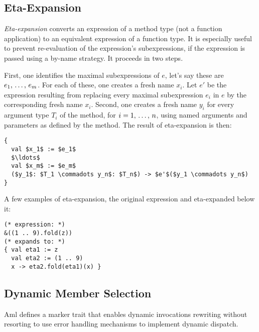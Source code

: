 



\subsection{Eta-Expansion}
\label{sec:eta-expansion}

{\em Eta-expansion} converts an expression of a method type (not a function application) to an equivalent expression of a function type. It is especially useful to prevent re-evaluation of the expression's subexpressions, if the expression is passed using a by-name strategy. It proceeds in two steps. 

First, one identifies the maximal subexpressions of $e$, let's say these are $e_1 ,\, \ldots ,\, e_m$. For each of these, one creates a fresh name $x_i$. Let $e'$ be the expression resulting from replacing every maximal subexpression $e_i$ in $e$ by the corresponding fresh name $x_i$. Second, one creates a fresh name $y_i$ for every argument type $T_i$ of the method, for $i = 1 ,\, \ldots ,\, n$, using named arguments and parameters as defined by the method. The result of eta-expansion is then: 
\begin{lstlisting}
{
  val $x_1$ := $e_1$
  $\ldots$
  val $x_m$ := $e_m$
  ($y_1$: $T_1 \commadots y_n$: $T_n$) -> $e'$($y_1 \commadots y_n$)
}
\end{lstlisting}

\example A few examples of eta-expansion, the original expression and eta-expanded below it:
\begin{lstlisting}
(* expression: *)
&((1 .. 9).fold(z))
(* expands to: *)
{ val eta1 := z
  val eta2 := (1 .. 9)
  x -> eta2.fold(eta1)(x) }
\end{lstlisting}







\subsection{Dynamic Member Selection}
\label{sec:dynamic-member-selection}

Aml defines a marker trait  that enables dynamic invocations rewriting without resorting to use error handling mechanisms to implement dynamic dispatch. 

